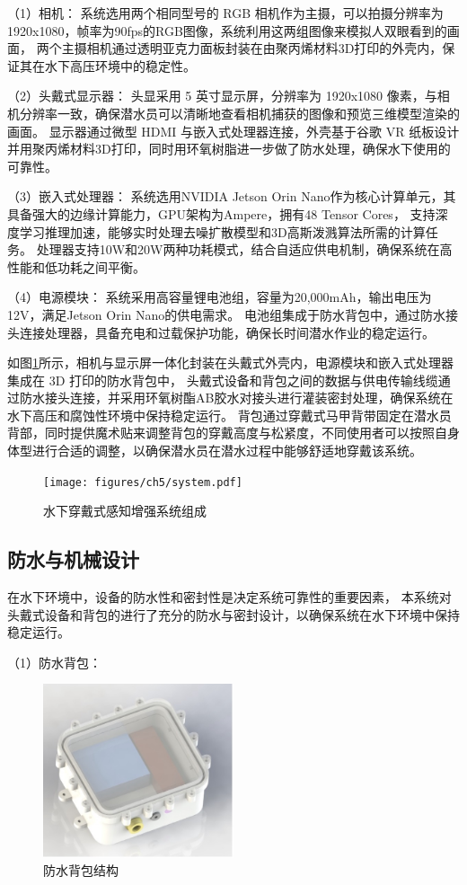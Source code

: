 （1）相机：
系统选用两个相同型号的 RGB 相机作为主摄，可以拍摄分辨率为1920x1080，帧率为90fps的RGB图像，系统利用这两组图像来模拟人双眼看到的画面，
两个主摄相机通过透明亚克力面板封装在由聚丙烯材料3D打印的外壳内，保证其在水下高压环境中的稳定性。

（2）头戴式显示器：
头显采用 5 英寸显示屏，分辨率为 1920x1080 像素，与相机分辨率一致，确保潜水员可以清晰地查看相机捕获的图像和预览三维模型渲染的画面。
显示器通过微型 HDMI 与嵌入式处理器连接，外壳基于谷歌 VR 纸板设计并用聚丙烯材料3D打印，同时用环氧树脂进一步做了防水处理，确保水下使用的可靠性。

（3）嵌入式处理器：
系统选用NVIDIA Jetson Orin Nano作为核心计算单元，其具备强大的边缘计算能力，GPU架构为Ampere，拥有48 Tensor Cores，
支持深度学习推理加速，能够实时处理去噪扩散模型和3D高斯泼溅算法所需的计算任务。
处理器支持10W和20W两种功耗模式，结合自适应供电机制，确保系统在高性能和低功耗之间平衡。

（4）电源模块：
系统采用高容量锂电池组，容量为20,000mAh，输出电压为12V，满足Jetson Orin Nano的供电需求。
电池组集成于防水背包中，通过防水接头连接处理器，具备充电和过载保护功能，确保长时间潜水作业的稳定运行。

如图\ref{img:system}所示，相机与显示屏一体化封装在头戴式外壳内，电源模块和嵌入式处理器集成在 3D 打印的防水背包中，
头戴式设备和背包之间的数据与供电传输线缆通过防水接头连接，并采用环氧树酯AB胶水对接头进行灌装密封处理，确保系统在水下高压和腐蚀性环境中保持稳定运行。
背包通过穿戴式马甲背带固定在潜水员背部，同时提供魔术贴来调整背包的穿戴高度与松紧度，不同使用者可以按照自身体型进行合适的调整，以确保潜水员在潜水过程中能够舒适地穿戴该系统。

\begin{figure}
    \centering
    \texttt{[image: figures/ch5/system.pdf]}
    \caption{水下穿戴式感知增强系统组成}
    \label{img:system}
\end{figure}

\subsection{防水与机械设计}
在水下环境中，设备的防水性和密封性是决定系统可靠性的重要因素，
本系统对头戴式设备和背包的进行了充分的防水与密封设计，以确保系统在水下环境中保持稳定运行。

（1）防水背包：
\begin{figure}[h]
    \centering
    \includegraphics[width=0.5\textwidth]{figures/ch5/bag.jpg}
    \caption{防水背包结构}
    \label{img:bag}
\end{figure}

